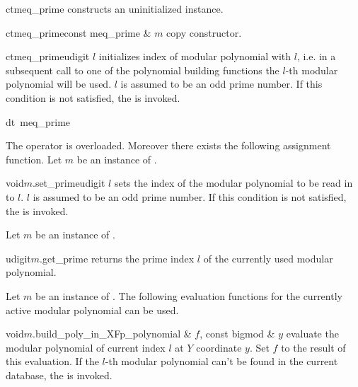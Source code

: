 \CONS

\begin{fcode}{ct}{meq_prime}{}
  constructs an uninitialized instance.
\end{fcode}

\begin{fcode}{ct}{meq_prime}{const meq_prime & $m$}
  copy constructor.
\end{fcode}

\begin{fcode}{ct}{meq_prime}{udigit $l$}
  initializes index of modular polynomial with $l$, i.e. in a subsequent call to one of the
  polynomial building functions the $l$-th modular polynomial will be used.  $l$ is assumed to be
  an odd prime number.  If this condition is not satisfied, the \LEH is invoked.
\end{fcode}

\begin{fcode}{dt}{~meq_prime}{}
\end{fcode}



\ASGN

The operator \code{=} is overloaded.  Moreover there exists the following assignment function.
Let $m$ be an instance of .

\begin{fcode}{void}{$m$.set_prime}{udigit $l$}
  sets the index of the modular polynomial to be read in to $l$.  $l$ is assumed to be an odd
  prime number.  If this condition is not satisfied, the \LEH is invoked.
\end{fcode}



\ACCS

Let $m$ be an instance of .

\begin{cfcode}{udigit}{$m$.get_prime}{}
  returns the prime index $l$ of the currently used modular polynomial.
\end{cfcode}



\HIGH

Let $m$ be an instance of .  The following evaluation functions for the currently
active modular polynomial can be used.

\begin{fcode}{void}{$m$.build_poly_in_X}{Fp_polynomial & $f$, const bigmod & $y$}
  evaluate the modular polynomial of current index $l$ at $Y$ coordinate $y$.  Set $f$ to the
  result of this evaluation.  If the $l$-th modular polynomial can't be found in the current
  database, the \LEH is invoked.
\end{fcode}

